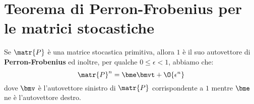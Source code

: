 \documentclass[\main/main.tex]{subfiles}
\begin{document}
\section{Teorema di Perron-Frobenius per le matrici stocastiche}
\begin{theorem}
  Se \(\matr{P}\) è una matrice stocastica primitiva, allora \(1\) è il suo autovettore di \textbf{Perron-Frobenius} ed inoltre, per qualche \(0 \leq \epsilon < 1\), abbiamo che:
  \[
    \matr{P}^n = \bme\bmvt + \O{\epsilon^n}
  \]
  dove \(\bmv \) è l'autovettore sinistro di \(\matr{P}\) corrispondente a \(1\) mentre \(\bme \) ne è l'autovettore destro.
\end{theorem}
\end{document}

